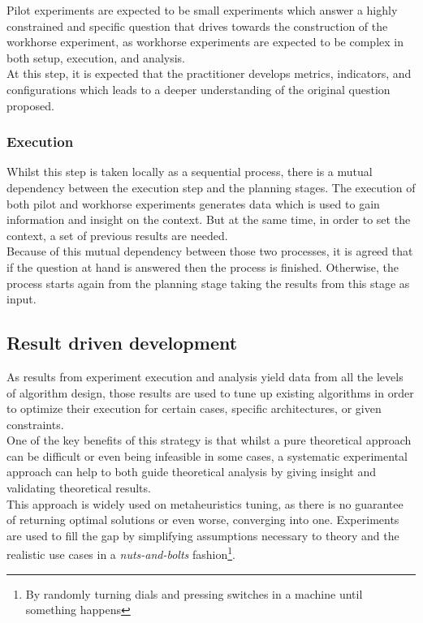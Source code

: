 Pilot experiments are expected to be small experiments which answer a highly constrained and specific question that drives towards the construction of the workhorse experiment, as workhorse experiments are expected to be complex in both setup, execution, and analysis. \\

At this step, it is expected that the practitioner develops metrics, indicators, and configurations which leads to a deeper understanding of the original question proposed.\\

\subsubsection{Execution}
Whilst this step is taken locally as a sequential process, there is a mutual dependency between the execution step and the planning stages. The execution of both pilot and workhorse experiments generates data which is used to gain information and insight on the context. But at the same time, in order to set the context, a set of previous results are needed. \\

Because of this mutual dependency between those two processes, it is agreed that if the question at hand is answered then the process is finished. Otherwise, the process starts again from the planning stage taking the results from this stage as input.\\

\subsection{Result driven development}
As results from experiment execution and analysis yield data from all the levels of algorithm design, those results are used to tune up existing algorithms in order to optimize their execution for certain cases, specific architectures, or given constraints.\\

One of the key benefits of this strategy is that whilst a pure theoretical approach can be difficult or even being infeasible in some cases, a systematic experimental approach can help to both guide theoretical analysis by giving insight and validating theoretical results.\\

This approach is widely used on metaheuristics tuning, as there is no guarantee of returning optimal solutions or even worse, converging into one. Experiments are used to fill the gap by simplifying assumptions necessary to theory and the realistic use cases in a \emph{nuts-and-bolts} fashion\footnote{By randomly turning dials and pressing switches in a machine until something happens}. \\

